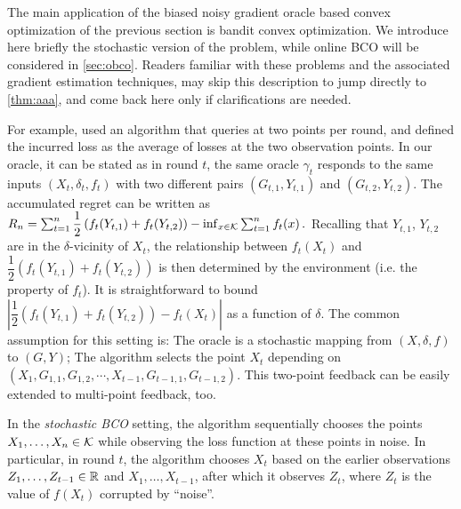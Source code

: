The main application of the biased noisy gradient oracle based convex optimization of the previous section
is bandit convex optimization. We introduce here briefly the stochastic version of the problem, while online BCO will be considered in \cref{sec:obco}. Readers familiar with these problems and the associated
gradient estimation techniques, may skip this description to jump directly to \cref{thm:aaa},
and come back here only if clarifications are needed.

For example, \cite{AgDeXi10} used an algorithm that queries at two points per round, and defined the incurred loss as the average of losses at the two observation points. In our oracle, it can be stated as in round $t$, the same oracle $\gamma_t$ responds to the same inputs $(X_t, \delta_t, f_t)$ with two different pairs $(G_{t,1}, Y_{t,1})$ and $(G_{t,2}, Y_{t,2})$. The accumulated regret can be written as
$%
R_n = \sum_{t=1}^n \dfrac{1}{2}\left( f_t(Y_{t,1})+f_t(Y_{t,2}) \right) -\inf_{x \in \cK}\sum_{t=1}^n f_t(x) \,.
$ %
Recalling that $Y_{t,1}$, $Y_{t,2}$ are in the $\delta$-vicinity of $X_t$, the relationship between $f_t(X_t)$ and $\dfrac{1}{2}\left( f_t(Y_{t,1})+f_t(Y_{t,2})\right)$ is then determined by the environment (i.e. the property of $f_t$). It is straightforward to bound $| \dfrac{1}{2}\left( f_t(Y_{t,1})+f_t(Y_{t,2})\right)- f_t(X_t)|$ as a function of $\delta$. 
The common assumption for this setting is: The oracle is a stochastic mapping from $(X, \delta, f)$ to $(G, Y)$; The algorithm selects the point $X_t$ depending on $\left( X_1, G_{1,1}, G_{1,2}, \cdots, X_{t-1},G_{t-1,1}, G_{t-1,2}  \right)$. This two-point feedback can be easily extended to multi-point feedback, too.
\fi

In the \emph{stochastic BCO} setting,
the algorithm sequentially chooses the points $X_1,\dots,X_n\in \mathcal{K}$ while observing the loss function at these points in noise.
In particular, in round $t$, the algorithm chooses $X_t$ based on the earlier observations $Z_1,\dots,Z_{t-1}\in \mathbb{R}$ and $X_1,\dots,X_{t-1}$, after which it observes $Z_t$, where $Z_t$ is the value of $f(X_t)$ corrupted by ``noise''.


